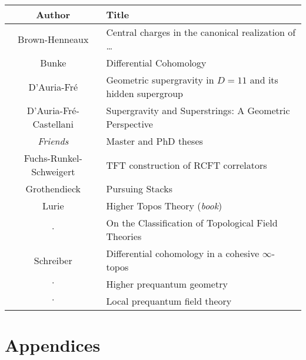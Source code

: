 \documentclass[11pt, a4paper]{report}
\begin{document}
    \begin{center}
        \begin{tabular}{|c|l|}
            \hline
            Author&Title\\
            \hline
            Brown-Henneaux&Central charges in the canonical realization of \ldots\\
			Bunke&Differential Cohomology\\
			D'Auria-Fr\'e&Geometric supergravity in $D=11$ and its hidden supergroup\\
			D'Auria-Fr\'e-Castellani&Supergravity and Superstrings: A Geometric Perspective\\
            \textit{Friends}&Master and PhD theses\\
            Fuchs-Runkel-Schweigert&TFT construction of RCFT correlators\\
            Grothendieck&Pursuing Stacks\\
            Lurie&Higher Topos Theory (\textit{book})\\
            $\cdot$&On the Classification of Topological Field Theories\\
            Schreiber&Differential cohomology in a cohesive $\infty$-topos\\
            $\cdot$&Higher prequantum geometry\\
            $\cdot$&Local prequantum field theory\\
            \hline
        \end{tabular}
    \end{center}

\part{Appendices}
\begin{appendices}






\end{appendices}

\nomenclature[S_zsyminto]{$]a,b[$}{open interval}

\printnomenclature

\nocite{*}



\printindex
\end{document}

